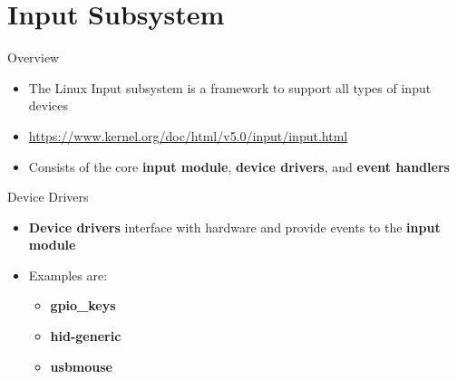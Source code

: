 \section{Input Subsystem}

\begin{frame}
   {Overview}

   \begin{itemize}
      \item
	      The Linux Input subsystem is a framework to support all types of input devices
      \item
	      \url{https://www.kernel.org/doc/html/v5.0/input/input.html}
      \item
	      Consists of the core \textbf{input module}, \textbf{device drivers}, and \textbf{event handlers}
   \end{itemize}
\end{frame}

\begin{frame}
	{Device Drivers}

	\begin{itemize}
		\item
			\textbf{Device drivers} interface with hardware and provide events to the \textbf{input module}
		\item
			Examples are:
			\begin{itemize}
				\item
					\textbf{gpio\_keys}
				\item
					\textbf{hid-generic}
				\item
					\textbf{usbmouse}
			\end{itemize}
	\end{itemize}
\end{frame}

